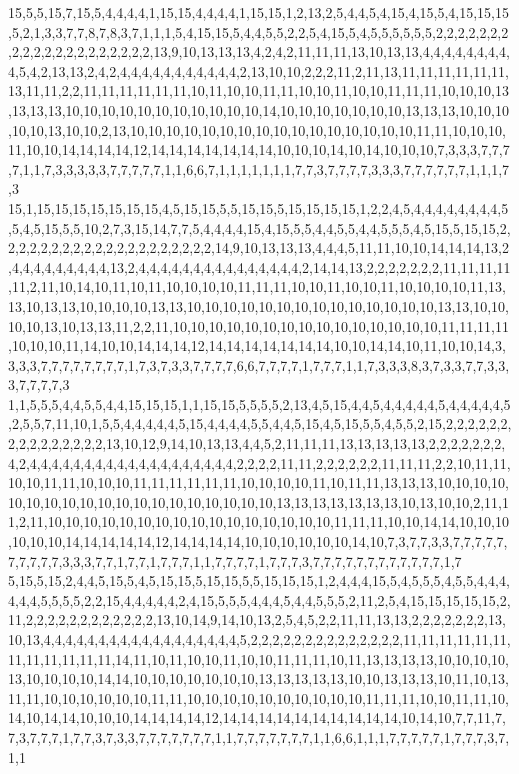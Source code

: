 15,5,5,15,7,15,5,4,4,4,4,1,15,15,4,4,4,4,1,15,15,1,2,13,2,5,4,4,5,4,15,4,15,5,4,15,15,15,5,2,1,3,3,7,7,8,7,8,3,7,1,1,1,5,4,15,15,5,4,4,5,5,2,2,5,4,15,5,4,5,5,5,5,5,5,2,2,2,2,2,2,2,2,2,2,2,2,2,2,2,2,2,2,2,2,13,9,10,13,13,13,4,2,4,2,11,11,11,13,10,13,13,4,4,4,4,4,4,4,4,4,5,4,2,13,13,2,4,2,4,4,4,4,4,4,4,4,4,4,4,2,13,10,10,2,2,2,11,2,11,13,11,11,11,11,11,11,13,11,11,2,2,11,11,11,11,11,11,10,11,10,10,11,11,10,10,11,10,10,11,11,11,10,10,10,13,13,13,13,10,10,10,10,10,10,10,10,10,10,10,14,10,10,10,10,10,10,10,13,13,13,10,10,10,10,10,13,10,10,2,13,10,10,10,10,10,10,10,10,10,10,10,10,10,10,10,10,11,11,10,10,10,11,10,10,14,14,14,14,12,14,14,14,14,14,14,14,10,10,10,14,10,14,10,10,10,7,3,3,3,7,7,7,7,1,1,7,3,3,3,3,3,7,7,7,7,7,1,1,6,6,7,1,1,1,1,1,1,1,7,7,3,7,7,7,7,3,3,3,7,7,7,7,7,7,1,1,1,7,3
15,1,15,15,15,15,15,15,15,4,5,15,15,5,5,15,15,5,15,15,15,15,1,2,2,4,5,4,4,4,4,4,4,4,4,5,5,4,5,15,5,5,10,2,7,3,15,14,7,7,5,4,4,4,4,15,4,15,5,5,4,4,5,5,4,4,5,5,5,4,5,15,5,15,15,2,2,2,2,2,2,2,2,2,2,2,2,2,2,2,2,2,2,2,2,14,9,10,13,13,13,4,4,4,5,11,11,10,10,14,14,14,13,2,4,4,4,4,4,4,4,4,4,13,2,4,4,4,4,4,4,4,4,4,4,4,4,4,4,4,2,14,14,13,2,2,2,2,2,2,2,11,11,11,11,11,2,11,10,14,10,11,10,11,10,10,10,10,11,11,11,10,10,11,10,10,11,10,10,10,10,11,13,13,10,13,13,10,10,10,10,13,13,10,10,10,10,10,10,10,10,10,10,10,10,10,10,13,13,10,10,10,10,13,10,13,13,11,2,2,11,10,10,10,10,10,10,10,10,10,10,10,10,10,10,10,11,11,11,11,10,10,10,11,14,10,10,14,14,14,12,14,14,14,14,14,14,14,10,10,14,14,10,11,10,10,14,3,3,3,3,7,7,7,7,7,7,7,7,1,7,3,7,3,3,7,7,7,7,6,6,7,7,7,7,1,7,7,7,1,1,7,3,3,3,8,3,7,3,3,7,7,3,3,3,7,7,7,7,3
1,1,5,5,5,4,4,5,5,4,4,15,15,15,1,1,15,15,5,5,5,5,2,13,4,5,15,4,4,5,4,4,4,4,4,5,4,4,4,4,4,5,2,5,5,7,11,10,1,5,5,4,4,4,4,4,5,15,4,4,4,4,5,5,4,4,5,15,4,5,15,5,5,4,5,5,2,15,2,2,2,2,2,2,2,2,2,2,2,2,2,2,2,13,10,12,9,14,10,13,13,4,4,5,2,11,11,11,13,13,13,13,13,2,2,2,2,2,2,2,4,2,4,4,4,4,4,4,4,4,4,4,4,4,4,4,4,4,4,4,4,2,2,2,2,11,11,2,2,2,2,2,2,11,11,11,2,2,10,11,11,10,10,11,11,10,10,10,11,11,11,11,11,11,10,10,10,10,11,10,11,11,13,13,13,10,10,10,10,10,10,10,10,10,10,10,10,10,10,10,10,10,10,10,13,13,13,13,13,13,13,10,13,10,10,2,11,11,2,11,10,10,10,10,10,10,10,10,10,10,10,10,10,10,10,10,11,11,11,10,10,14,14,10,10,10,10,10,10,14,14,14,14,14,12,14,14,14,14,10,10,10,10,10,10,14,10,7,3,7,7,3,3,7,7,7,7,7,7,7,7,7,7,3,3,3,7,7,1,7,7,1,7,7,7,1,1,7,7,7,7,1,7,7,7,3,7,7,7,7,7,7,7,7,7,7,7,7,1,7
5,15,5,15,2,4,4,5,15,5,4,5,15,15,5,15,15,5,5,15,15,15,1,2,4,4,4,15,5,4,5,5,5,4,5,5,4,4,4,4,4,4,5,5,5,5,2,2,15,4,4,4,4,4,2,4,15,5,5,5,4,4,4,5,4,4,5,5,5,2,11,2,5,4,15,15,15,15,15,2,11,2,2,2,2,2,2,2,2,2,2,2,2,13,10,14,9,14,10,13,2,5,4,5,2,2,11,11,13,13,2,2,2,2,2,2,2,13,10,13,4,4,4,4,4,4,4,4,4,4,4,4,4,4,4,4,4,4,5,2,2,2,2,2,2,2,2,2,2,2,2,2,2,11,11,11,11,11,11,11,11,11,11,11,11,14,11,10,11,10,10,11,10,10,11,11,11,10,11,13,13,13,13,10,10,10,10,13,10,10,10,10,14,14,10,10,10,10,10,10,10,13,13,13,13,13,10,10,13,13,13,10,11,10,13,11,11,10,10,10,10,10,10,11,11,10,10,10,10,10,10,10,10,10,10,11,11,11,10,10,11,11,10,14,10,14,14,10,10,10,14,14,14,14,12,14,14,14,14,14,14,14,14,14,14,10,14,10,7,7,11,7,7,3,7,7,7,1,7,7,3,7,3,3,7,7,7,7,7,7,7,1,1,7,7,7,7,7,7,7,1,1,6,6,1,1,1,7,7,7,7,7,1,7,7,7,3,7,1,1
